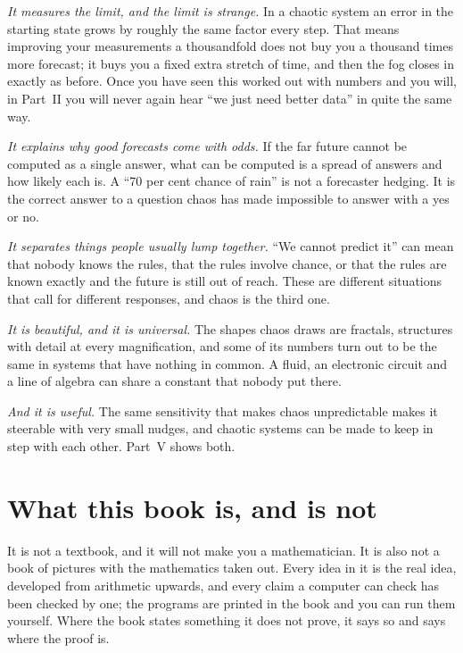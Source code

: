 \emph{It measures the limit, and the limit is strange.} In a chaotic
system an error in the starting state grows by roughly the same factor every
step. That means improving your measurements a thousandfold does not buy you
a thousand times more forecast; it buys you a fixed extra stretch of time,
and then the fog closes in exactly as before. Once you have seen this worked
out with numbers \dash{} and you will, in Part~II \dash{} you will never
again hear \enquote{we just need better data} in quite the same way.

\emph{It explains why good forecasts come with odds.} If the far future
cannot be computed as a single answer, what can be computed is a spread of
answers and how likely each is. A \enquote{70 per cent chance of rain} is not
a forecaster hedging. It is the correct answer to a question chaos has made
impossible to answer with a yes or no.

\emph{It separates things people usually lump together.} \enquote{We cannot
predict it} can mean that nobody knows the rules, that the rules involve
chance, or that the rules are known exactly and the future is still out of
reach. These are different situations that call for different responses,
and chaos is the third one.

\emph{It is beautiful, and it is universal.} The shapes chaos draws are
fractals, structures with detail at every magnification, and some of its
numbers turn out to be the same in systems that have nothing in common. A
fluid, an electronic circuit and a line of algebra can share a constant that
nobody put there.

\emph{And it is useful.} The same sensitivity that makes chaos
unpredictable makes it steerable with very small nudges, and chaotic
systems can be made to keep in step with each other. Part~V shows both.

\section*{What this book is, and is not}

It is not a textbook, and it will not make you a mathematician. It is also
not a book of pictures with the mathematics taken out. Every idea in it is
the real idea, developed from arithmetic upwards, and every claim a computer
can check has been checked by one; the programs are printed in the book and
you can run them yourself. Where the book states something it does not
prove, it says so and says where the proof is.

